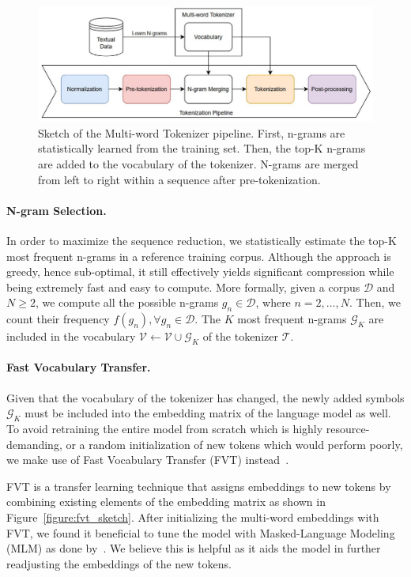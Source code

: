 \documentclass[11pt]{article}
\begin{document}
\begin{figure}[ht]
    \centering
    \includegraphics[scale=0.85]{images/tokenizer.JPG}
    \caption{Sketch of the Multi-word Tokenizer pipeline. First, n-grams are statistically learned from the training set. Then, the top-K n-grams are added to the vocabulary of the tokenizer. N-grams are merged from left to right within a sequence after pre-tokenization.}
    \label{figure:mwt_sketch}
\end{figure}

\paragraph{N-gram Selection.}
In order to maximize the sequence reduction, we statistically estimate the top-K most frequent n-grams in a reference training corpus. Although the approach is greedy, hence sub-optimal, it still effectively yields significant compression while being extremely fast and easy to compute. More formally, given a corpus $\mathcal{D}$ and $N \geq 2$, we compute all the possible n-grams $g_n \in \mathcal{D}$, where $n=2,\ldots, N$. Then, we count their frequency $f(g_n), \forall g_n \in \mathcal{D}$. The $K$ most frequent n-grams $\mathcal{G}_K$ are included in the vocabulary $\mathcal{V} \leftarrow \mathcal{V} \cup \mathcal{G}_K$ of the tokenizer $\mathcal{T}$.

\paragraph{Fast Vocabulary Transfer.} Given that the vocabulary of the tokenizer has changed, the newly added symbols $\mathcal{G}_K$ must be included into the embedding matrix of the language model as well. To avoid retraining the entire model from scratch which is highly resource-demanding, or a random initialization of new tokens which would perform poorly, we make use of Fast Vocabulary Transfer (FVT) instead~\citep{FVT}. 

FVT is a transfer learning technique that assigns embeddings to new tokens by combining existing elements of the embedding matrix as shown in Figure~\ref{figure:fvt_sketch}. After initializing the multi-word embeddings with FVT, we found it beneficial to tune the model with Masked-Language Modeling (MLM) as done by~\citet{FVT}. We believe this is helpful as it aids the model in further readjusting the embeddings of the new tokens.
\end{document}
